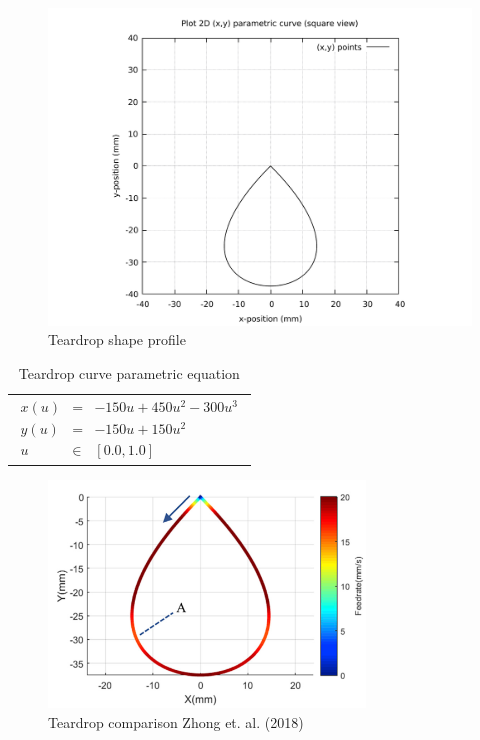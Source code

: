 \clearpage
\pagebreak

\begin{figure}
	\caption{Teardrop shape profile}
	\label{Teardrop-curve-plot-BW.pdf}
	\centering
	\includegraphics[width=1.00\textwidth]{Chap3/curve-shape/curves/Teardrop-curve-plot-BW.pdf} 
\end{figure}

\begin{table}[ht]
	\begin{center}
		\begin{tabular}{ p{16.0cm} }
			\caption{Teardrop curve parametric equation}
			\begin{eqnarray}
				x(u) & = & - 150u + 450u^2 - 300u^3 \nonumber \\   
				y(u) & = & - 150u + 150u^2 \nonumber \\
				u & \in & [0.0, 1.0] \nonumber
			\end{eqnarray}
		\end{tabular}
	\end{center}
\end{table}

\clearpage
\pagebreak

\begin{figure}
	\caption{Teardrop comparison Zhong et. al. (2018) }
	\label{Comparison-Teardrop-Zhong-et-al-2018.png}
	\centering
	\includegraphics[width=0.750\textwidth]{Images/Chap3/Comparison-Teardrop-Zhong-et-al-2018.png} 
\end{figure}

